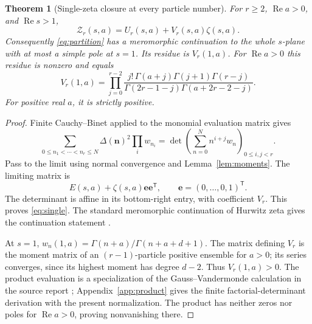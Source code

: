 \documentclass[11pt,letterpaper]{article}
\numberwithin{equation}{section}
\newtheorem{theorem}{Theorem}[section]
\theoremstyle{definition}\newtheorem{definition}[theorem]{Definition}
\theoremstyle{remark}\newtheorem{remark}[theorem]{Remark}
\DeclareMathOperator{\Rea}{Re}
\newcommand{\Z}{\mathcal Z}\newcommand{\Bell}{\mathcal B}
\newcommand{\ee}{\bm e}
\begin{document}
\begin{theorem}[Single-zeta closure at every particle number]\label{thm:single}
For $r\ge2$, $\Rea a>0$, and $\Rea s>1$,
\begin{equation}\label{eq:single}
 \boxed{\displaystyle\Z_r(s,a)=U_r(s,a)+V_r(s,a)\zeta(s,a).}
\end{equation}
Consequently \eqref{eq:partition} has a meromorphic continuation to the
whole $s$-plane with at most a simple pole at $s=1$. Its residue is
$V_r(1,a)$. For $\Rea a>0$ this residue is nonzero and equals
\begin{equation}\label{eq:residue-product}
 V_r(1,a)=\prod_{j=0}^{r-2}
 \frac{j!\,\Gamma(a+j)\Gamma(j+1)\Gamma(r-j)}
 {\Gamma(2r-1-j)\Gamma(a+2r-2-j)}.
\end{equation}
For positive real $a$, it is strictly positive.
\end{theorem}
\begin{proof}
Finite Cauchy--Binet applied to the monomial evaluation matrix gives
\[
 \sum_{0\le n_1<\cdots<n_r\le N}\Delta(\bm n)^2\prod_i w_{n_i}
   =\det\left(\sum_{n=0}^N n^{i+j}w_n\right)_{0\le i,j<r}.
\]
Pass to the limit using normal convergence and
Lemma~\ref{lem:moments}. The limiting matrix is
\[
 E(s,a)+\zeta(s,a)\ee\ee^{\mathsf T},\qquad
 \ee=(0,\ldots,0,1)^{\mathsf T}.
\]
The determinant is affine in its bottom-right entry, with coefficient
$V_r$. This proves \eqref{eq:single}. The standard meromorphic
continuation of Hurwitz zeta gives the continuation statement
\cite{dlmf:hurwitz}.

At $s=1$, $w_n(1,a)=\Gamma(n+a)/\Gamma(n+a+d+1)$.
The matrix defining $V_r$ is the moment matrix of an $(r-1)$-particle
positive ensemble for $a>0$; its series converges, since its highest
moment has degree $d-2$. Thus $V_r(1,a)>0$. The product evaluation is
a specialization of the Gauss--Vandermonde calculation in the source
report \cite{repo:dhr}; Appendix~\ref{app:product} gives the finite
factorial-determinant derivation with the present normalization. The product
has neither zeros nor poles for $\Rea a>0$, proving nonvanishing there.
\end{proof}
\end{document}
